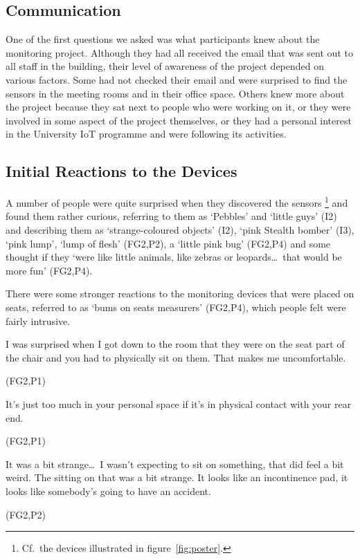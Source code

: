 \subsection{Communication}
\label{sec:communication}

One of the first questions we asked was what participants knew about
the monitoring project. Although they had all received the email that
was sent out to all staff in the building, their level of awareness of
the project depended on various factors. Some had not checked their
email and were surprised to find the sensors in the meeting rooms and
in their office space. Others knew more about the project because they sat next
to people who were working on it, or they were involved in some
aspect of the project themselves, or they had a personal interest in the
University IoT programme and were following its activities.

\subsection{Initial Reactions to the Devices}
\label{sec:init-reactions}

A number of people were quite surprised when they discovered the
sensors%
\footnote{ 
Cf.\ the devices illustrated in figure~\ref{fig:poster}.
}
and found them rather curious, referring to them as `Pebbles’
and ‘little guys’ (I2) and describing them as
`strange-coloured objects’ (I2), `pink Stealth bomber’
(I3), `pink lump’, `lump of flesh’ (FG2,P2), a ‘little pink bug’ (FG2,P4) and some
thought if they `were like little animals, like zebras or
leopards\ldots\  that would be more fun’ (FG2,P4).

There were some stronger reactions to the monitoring devices that were
placed on seats, referred to as `bums on seats measurers’ (FG2,P4),
which people felt were fairly intrusive.

\begin{qt}I was surprised when I got down to the room that they were on the
seat part of the chair and you had to physically sit on them. That
makes me uncomfortable.\end{qt} (FG2,P1)

\begin{qt}It’s just too much in your personal space if it’s in
  physical contact with your rear end.\end{qt} (FG2,P1)

\begin{qt}It was a bit strange\ldots\  I wasn’t
expecting to sit on something, that did feel a bit weird. The sitting on
that was a bit strange. It looks like an incontinence pad, it looks
like somebody’s going to have an accident.\end{qt} (FG2,P2)

